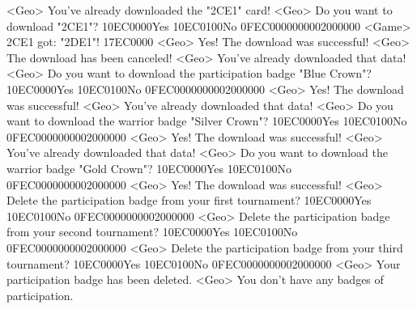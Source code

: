 <Geo> You've already downloaded the "{2C}{E1}" card! 
<Geo> Do you want to download "{2C}{E1}"? {10}{EC}{00}{00}Yes {10}{EC}{01}{00}No {0F}{EC}{00}{00}{00}{00}{02}{00}{00}{00}
<Game> {2C}{E1} got: "{2D}{E1}"! 
{17}{EC}{00}{00} 
<Geo> Yes! The download was successful! 
<Geo> The download has been canceled! 
<Geo> You've already downloaded that data! 
<Geo> Do you want to download the participation badge "Blue Crown"? {10}{EC}{00}{00}Yes {10}{EC}{01}{00}No {0F}{EC}{00}{00}{00}{00}{02}{00}{00}{00}
<Geo> Yes! The download was successful! 
<Geo> You've already downloaded that data! 
<Geo> Do you want to download the warrior badge "Silver Crown"? {10}{EC}{00}{00}Yes {10}{EC}{01}{00}No {0F}{EC}{00}{00}{00}{00}{02}{00}{00}{00}
<Geo> Yes! The download was successful! 
<Geo> You've already downloaded that data! 
<Geo> Do you want to download the warrior badge "Gold Crown"? {10}{EC}{00}{00}Yes {10}{EC}{01}{00}No {0F}{EC}{00}{00}{00}{00}{02}{00}{00}{00}
<Geo> Yes! The download was successful! 
<Geo> Delete the participation badge from your first tournament? {10}{EC}{00}{00}Yes {10}{EC}{01}{00}No {0F}{EC}{00}{00}{00}{00}{02}{00}{00}{00}
<Geo> Delete the participation badge from your second tournament? {10}{EC}{00}{00}Yes {10}{EC}{01}{00}No {0F}{EC}{00}{00}{00}{00}{02}{00}{00}{00}
<Geo> Delete the participation badge from your third tournament? {10}{EC}{00}{00}Yes {10}{EC}{01}{00}No {0F}{EC}{00}{00}{00}{00}{02}{00}{00}{00}
<Geo> Your participation badge has been deleted. 
<Geo> You don't have any badges of participation. 
